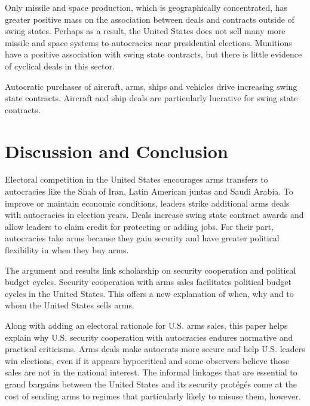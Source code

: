 \documentclass[12pt]{article}
\begin{document}
Only missile and space production, which is geographically concentrated, has greater positive mass on the association between deals and contracts outside of swing states. 
Perhaps as a result, the United States does not sell many more missile and space systems to autocracies near presidential elections. 
Munitions have a positive association with swing state contracts, but there is little evidence of cyclical deals in this sector. 


Autocratic purchases of aircraft, arms, ships and vehicles drive increasing swing state contracts.
Aircraft and ship deals are particularly lucrative for swing state contracts. 



\section{Discussion and Conclusion}


Electoral competition in the United States encourages arms transfers to autocracies like the Shah of Iran, Latin American juntas and Saudi Arabia.
To improve or maintain economic conditions, leaders strike additional arms deals with autocracies in election years.
Deals increase swing state contract awards and allow leaders to claim credit for protecting or adding jobs.
For their part, autocracies take arms because they gain security and have greater political flexibility in when they buy arms. 


The argument and results link scholarship on security cooperation and political budget cycles. 
Security cooperation with arms sales facilitates political budget cycles in the United States. 
This offers a new explanation of when, why and to whom the United States sells arms. 


Along with adding an electoral rationale for U.S. arms sales, this paper helps explain why U.S. security cooperation with autocracies endures normative and practical criticisms. 
Arms deals make autocrats more secure and help U.S. leaders win elections, even if it appears hypocritical and some observers believe those sales are not in the national interest. 
The informal linkages that are essential to grand bargains between the United States and its security prot{\'e}g{\'e}s come at the cost of sending arms to regimes that particularly likely to misuse them, however. 
\end{document}

